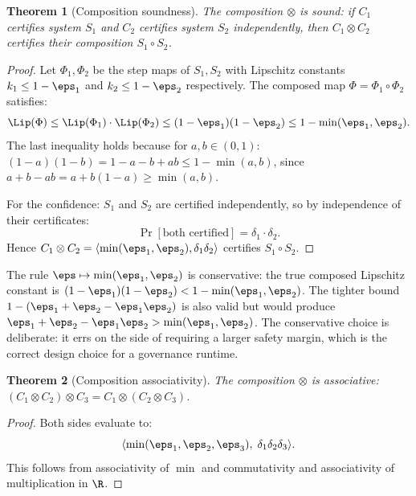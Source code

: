 \documentclass[11pt,letterpaper]{article}
\newtheorem{theorem}{Theorem}[section]
\theoremstyle{remark}
\begin{document}
\begin{theorem}[Composition soundness]
\label{thm:A-compose-sound}
The composition $\otimes$ is sound: if $C_1$ certifies system $S_1$
and $C_2$ certifies system $S_2$ independently, then $C_1 \otimes C_2$
certifies their composition $S_1 \circ S_2$.
\end{theorem}

\begin{proof}
Let $\Phi_1, \Phi_2$ be the step maps of $S_1, S_2$ with Lipschitz
constants $k_1 \leq 1 - \eps_1$ and $k_2 \leq 1 - \eps_2$ respectively.
The composed map $\Phi = \Phi_1 \circ \Phi_2$ satisfies:
\[
  \Lip(\Phi) \leq \Lip(\Phi_1) \cdot \Lip(\Phi_2)
  \leq (1-\eps_1)(1-\eps_2) \leq 1 - \min(\eps_1,\eps_2).
\]
The last inequality holds because for $a,b \in (0,1)$:
$(1-a)(1-b) = 1 - a - b + ab \leq 1 - \min(a,b)$,
since $a + b - ab = a + b(1-a) \geq \min(a,b)$.

For the confidence: $S_1$ and $S_2$ are certified independently,
so by independence of their certificates:
\[
  \Pr[\text{both certified}] = \delta_1 \cdot \delta_2.
\]
Hence $C_1 \otimes C_2 = \langle\min(\eps_1,\eps_2), \delta_1\delta_2\rangle$
certifies $S_1 \circ S_2$.
\end{proof}

\begin{remark}
The rule $\eps \mapsto \min(\eps_1,\eps_2)$ is conservative: the true
composed Lipschitz constant is $(1-\eps_1)(1-\eps_2) < 1 - \min(\eps_1,\eps_2)$.
The tighter bound $1 - (\eps_1 + \eps_2 - \eps_1\eps_2)$ is also valid
but would produce $\eps_1 + \eps_2 - \eps_1\eps_2 > \min(\eps_1,\eps_2)$.
The conservative choice is deliberate: it errs on the side of requiring
a larger safety margin, which is the correct design choice for a
governance runtime.
\end{remark}

\begin{theorem}[Composition associativity]
\label{thm:A-compose-assoc}
The composition $\otimes$ is associative:
$(C_1 \otimes C_2) \otimes C_3 = C_1 \otimes (C_2 \otimes C_3)$.
\end{theorem}

\begin{proof}
Both sides evaluate to:
\[
  \langle\min(\eps_1,\eps_2,\eps_3),\; \delta_1\delta_2\delta_3\rangle.
\]
This follows from associativity of $\min$ and commutativity and
associativity of multiplication in $\R$.
\end{proof}
\end{document}
